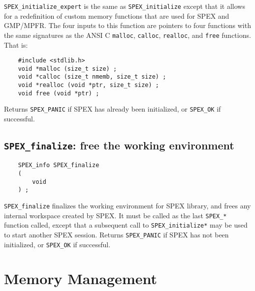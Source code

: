 \documentclass[12pt]{report}
\theoremstyle{definition}
\begin{document}
\verb|SPEX_initialize_expert| is the same as \verb|SPEX_initialize| except that
it allows for a redefinition of custom memory functions that are used for SPEX
and GMP/MPFR.  The four inputs to this function are pointers to four
functions with the same signatures as the ANSI C \verb'malloc', \verb'calloc',
\verb'realloc', and \verb'free' functions.  That is:

\begin{mdframed}[userdefinedwidth=6in]
{\footnotesize
\begin{verbatim}
    #include <stdlib.h>
    void *malloc (size_t size) ;
    void *calloc (size_t nmemb, size_t size) ;
    void *realloc (void *ptr, size_t size) ;
    void free (void *ptr) ;
\end{verbatim}
} \end{mdframed}

Returns \verb|SPEX_PANIC| if SPEX has already been initialized,
or \verb|SPEX_OK| if successful.

\cprotect\subsection{\verb|SPEX_finalize|: free the working environment}
\label{ss:SPEX_finalize}

\begin{mdframed}[userdefinedwidth=6in]
{\footnotesize
\begin{verbatim}
    SPEX_info SPEX_finalize
    (
        void
    ) ;
\end{verbatim}
} \end{mdframed}

\verb|SPEX_finalize| finalizes the working environment for SPEX
library, and frees any internal workspace created by SPEX.  It must be
called as the last \verb|SPEX_*| function called, except that a subsequent
call to \verb|SPEX_initialize*| may be used to start another SPEX session.
Returns \verb|SPEX_PANIC| if SPEX has not been initialized,
or \verb|SPEX_OK| if successful.

\section{Memory Management} \label{s:user:memmanag}
\end{document}
